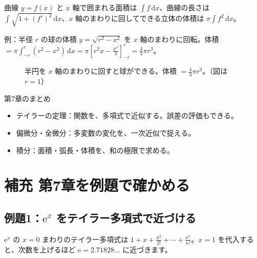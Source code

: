 \documentclass[a4paper,11pt,openany]{ltjsbook}
\newcommand{\dd}{\mathrm{d}}
\newcommand{\ee}{\mathrm{e}}
\begin{document}
曲線 $y=f(x)$ と $x$ 軸で囲まれる面積は $\int f\,\dd x$、曲線の長さは $\int\sqrt{1+(f')^2}\,\dd x$、$x$ 軸のまわりに回してできる立体の体積は $\pi\int f^2\,\dd x$。

\begin{examplebox}{例：半径 $r$ の球の体積}
$y=\sqrt{r^2-x^2}$ を $x$ 軸のまわりに回転。体積 $=\pi\int_{-r}^r(r^2-x^2)\,\dd x=\pi\left[r^2x-\frac{x^3}{3}\right]_{-r}^{r}=\frac43\pi r^3$。
\end{examplebox}

\begin{figure}[htbp]
\centering
{}
\caption{半円を $x$ 軸のまわりに回すと球ができる。体積 $=\frac43\pi r^3$。（図は $r=1$）}
\end{figure}

\begin{pointbox}{第7章のまとめ}
\begin{itemize}[leftmargin=1.5em]
\item テイラーの定理：関数を、多項式で近似する。誤差の評価もできる。
\item 偏微分・全微分：多変数の変化を、一次近似で捉える。
\item 積分：面積・弧長・体積を、和の極限で求める。
\end{itemize}
\end{pointbox}

\section{補充 第7章を例題で確かめる}

\subsection*{例題1：$\ee^x$ をテイラー多項式で近づける}

$\ee^x$ の $x=0$ まわりのテイラー多項式は $1+x+\frac{x^2}{2!}+\cdots+\frac{x^n}{n!}$。$x=1$ を代入すると、次数を上げるほど $\ee=2.71828\ldots$ に近づきます。
\end{document}
